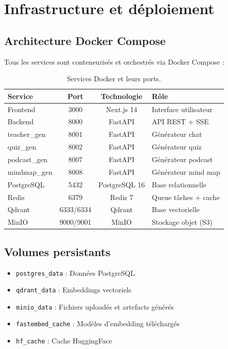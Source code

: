 \documentclass[12pt,a4paper]{article}
\begin{document}
\section{Infrastructure et déploiement}

\subsection{Architecture Docker Compose}

Tous les services sont conteneurisés et orchestrés via Docker Compose :

\begin{table}[H]
    \centering
    \begin{tabularx}{\textwidth}{@{}lccX@{}}
        \toprule
        \textbf{Service} & \textbf{Port} & \textbf{Technologie} & \textbf{Rôle} \\
        \midrule
        Frontend & 3000 & Next.js 14 & Interface utilisateur \\
        Backend & 8000 & FastAPI & API REST + SSE \\
        teacher\_gen & 8001 & FastAPI & Générateur chat \\
        quiz\_gen & 8002 & FastAPI & Générateur quiz \\
        podcast\_gen & 8007 & FastAPI & Générateur podcast \\
        mindmap\_gen & 8008 & FastAPI & Générateur mind map \\
        \midrule
        PostgreSQL & 5432 & PostgreSQL 16 & Base relationnelle \\
        Redis & 6379 & Redis 7 & Queue tâches + cache \\
        Qdrant & 6333/6334 & Qdrant & Base vectorielle \\
        MinIO & 9000/9001 & MinIO & Stockage objet (S3) \\
        \bottomrule
    \end{tabularx}
    \caption{Services Docker et leurs ports.}
\end{table}

\subsection{Volumes persistants}

\begin{itemize}
    \item \texttt{postgres\_data} : Données PostgreSQL
    \item \texttt{qdrant\_data} : Embeddings vectoriels
    \item \texttt{minio\_data} : Fichiers uploadés et artefacts générés
    \item \texttt{fastembed\_cache} : Modèles d'embedding téléchargés
    \item \texttt{hf\_cache} : Cache HuggingFace
\end{itemize}
\end{document}
